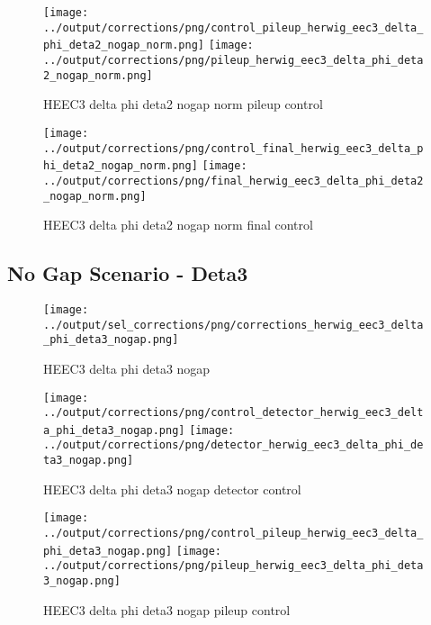 \documentclass[11pt]{book}
\begin{document}
\begin{figure}[ht]
\centering
\texttt{[image: ../output/corrections/png/control\_pileup\_herwig\_eec3\_delta\_phi\_deta2\_nogap\_norm.png]}
\texttt{[image: ../output/corrections/png/pileup\_herwig\_eec3\_delta\_phi\_deta2\_nogap\_norm.png]}
\caption{HEEC3 delta phi deta2 nogap norm pileup control}
\label{fig:HEEC3_delta_phi_deta2_nogap_norm_pileup_control}
\end{figure}


\begin{figure}[ht]
\centering
\texttt{[image: ../output/corrections/png/control\_final\_herwig\_eec3\_delta\_phi\_deta2\_nogap\_norm.png]}
\texttt{[image: ../output/corrections/png/final\_herwig\_eec3\_delta\_phi\_deta2\_nogap\_norm.png]}
\caption{HEEC3 delta phi deta2 nogap norm final control}
\label{fig:HEEC3_delta_phi_deta2_nogap_norm_final_control}
\end{figure}



\clearpage
\subsection{No Gap Scenario - Deta3}
\begin{figure}[ht]
\centering
\texttt{[image: ../output/sel\_corrections/png/corrections\_herwig\_eec3\_delta\_phi\_deta3\_nogap.png]}
\caption{HEEC3 delta phi deta3 nogap}
\label{fig:HEEC3_delta_phi_deta3_nogap}
\end{figure}


\begin{figure}[ht]
\centering
\texttt{[image: ../output/corrections/png/control\_detector\_herwig\_eec3\_delta\_phi\_deta3\_nogap.png]}
\texttt{[image: ../output/corrections/png/detector\_herwig\_eec3\_delta\_phi\_deta3\_nogap.png]}
\caption{HEEC3 delta phi deta3 nogap detector control}
\label{fig:HEEC3_delta_phi_deta3_nogap_detector_control}
\end{figure}

\begin{figure}[ht]
\centering
\texttt{[image: ../output/corrections/png/control\_pileup\_herwig\_eec3\_delta\_phi\_deta3\_nogap.png]}
\texttt{[image: ../output/corrections/png/pileup\_herwig\_eec3\_delta\_phi\_deta3\_nogap.png]}
\caption{HEEC3 delta phi deta3 nogap pileup control}
\label{fig:HEEC3_delta_phi_deta3_nogap_pileup_control}
\end{figure}
\end{document}
